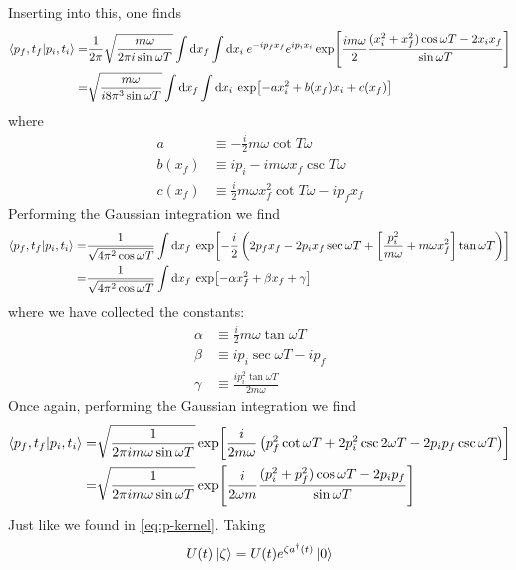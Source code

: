 \documentclass[a4paper,11pt]{article}
\begin{document}
Inserting into this, one finds
\begin{equation}
\begin{aligned}
\braket{p_f,t_f}{p_i,t_i}=&\frac{1}{2\pi}\sqrt{\frac{m\omega}{2\pi i \sin{\omega T}}}\int\dd x_f \int  \dd x_i \: e^{-ip_fx_f} e^{ip_ix_i} \exp[\frac{i m \omega}{2 }\frac{(x_i^2+x_f^2)\cos{\omega T}-2x_i x_f}{\sin{\omega T}}]\\
=&\sqrt{\frac{m\omega}{i 8\pi^3 \sin{\omega T}}}\int\dd x_f\int  \dd x_i \: \exp[-ax_i^2+b(x_f)x_i+c(x_f)]
\end{aligned}
\end{equation}
where 
\begin{equation}
\begin{aligned}
a&\equiv-\frac{i}{2}m\omega \cot{T \omega}\\
b(x_f)&\equiv ip_i-im\omega x_f \csc{T\omega}\\
c(x_f)&\equiv\frac{i}{2}m\omega x_f^2 \cot{T\omega}-ip_f x_f
\end{aligned}
\end{equation}
Performing the Gaussian integration we find
\begin{equation}
\begin{aligned}
\braket{p_f,t_f}{p_i,t_i}=&\frac{1}{\sqrt{4\pi^2\cos{\omega T}}}
\int\dd x_f \: \exp[-\frac{i}{2 }
\left(2p_fx_f-2p_ix_f\sec{\omega T}+\left[\frac{p_i^2}{m\omega}+m\omega x_f^2\right]\tan{\omega T}\right)
]\\
=&
\frac{1}{\sqrt{4\pi^2\cos{\omega T}}}
\int\dd x_f \: \exp[-\alpha x_f^2+\beta x_f+\gamma]
\end{aligned}
\end{equation}
where we have collected the constants:
\begin{equation}
\begin{aligned}
\alpha&\equiv\frac{i}{2}m\omega \tan{\omega T}\\
\beta&\equiv ip_i\sec{\omega T} -ip_f\\
\gamma&\equiv \frac{ip_i^2\tan{\omega T}}{2m\omega}
\end{aligned}
\end{equation}
Once again, performing the Gaussian integration we find
\begin{equation}
	\begin{aligned}
		\braket{p_f,t_f}{p_i,t_i}=&\sqrt{\frac{1}{2\pi im\omega \sin{\omega T}}}\exp[\frac{i}{2m\omega}\left(p_f^2\cot{\omega T}+2p_i^2\csc{2\omega T}-2p_ip_f\csc{\omega T}\right)]\\
		=&
		\sqrt{\frac{1}{2\pi im\omega \sin{\omega T}}}\exp[\frac{i}{2\omega m }\frac{(p_i^2+p_f^2)\cos{\omega T}-2p_i p_f}{\sin{\omega T}}]
	\end{aligned}
\end{equation}
Just like we found in \eqref{eq:p-kernel}.
Taking
\begin{equation}
\begin{aligned}
U(t)\ket{\zeta}=U(t)e^{\zeta a^\dagger(t)}\ket{0}
\end{aligned}
\end{equation}
\newpage
\end{document}
